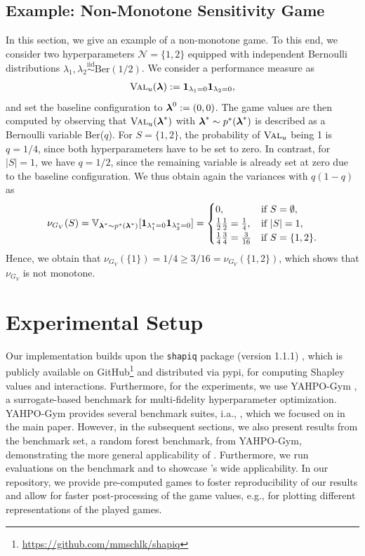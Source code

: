 \documentclass[letterpaper]{article} %
\begin{document}
\subsection{Example: Non-Monotone Sensitivity Game}\label{appx_sec_non_monotone_example}
In this section, we give an example of a non-monotone \sensitivity game.
To this end, we consider two hyperparameters $\mathcal N = \{1,2\}$ equipped with independent Bernoulli distributions $\lambda_1,\lambda_2 \overset{\text{iid}}{\sim} \text{Ber}(1/2)$.
We consider a performance measure as
\begin{align*}
    \textsc{Val}_u(\boldsymbol{\lambda}) := \mathbf{1}_{\lambda_1=0}\mathbf{1}_{\lambda_2=0},
\end{align*}
and set the baseline configuration to $\boldsymbol{\lambda}^0 := (0,0)$. 
The \sensitivity game values are then computed by observing that $\textsc{Val}_u(\boldsymbol{\lambda}^\ast)$ with $\boldsymbol{\lambda}^\ast \sim p^\ast(\boldsymbol{\lambda}^\ast)$ is described as a Bernoulli variable Ber($q$).
For $S=\{1,2\}$, the probability of $\textsc{Val}_u$ being 1 is $q=1/4$, since both hyperparameters have to be set to zero.
In contrast, for $\vert S \vert = 1$, we have $q=1/2$, since the remaining variable is already set at zero due to the baseline configuration.
We thus obtain again the variances with $q(1-q)$ as 
\[
\nu_{G_V}(S) = \mathbb{V}_{\boldsymbol{\lambda}^\ast \sim p^\ast(\boldsymbol{\lambda}^\ast)}[\mathbf{1}_{\lambda^\ast_1=0}\mathbf{1}_{\lambda^\ast_2=0}] = 
    \begin{cases}
        0, & \text{if } S=\emptyset, \\
        \frac{1}{2}\frac{1}{2} = \frac{1}{4}, &\text{if } \vert S \vert = 1, \\
        \frac{1}{4}\frac{3}{4} = \frac{3}{16} &\text{if } S= \{1,2\}.

    \end{cases}
\]
Hence, we obtain that $\nu_{G_V}(\{1\}) = 1/4 \geq 3/16 = \nu_{G_V}(\{1,2\})$, which shows that $\nu_{G_V}$ is not monotone.

\section{Experimental Setup}\label{app_experiment-setup}

Our implementation builds upon the \texttt{shapiq} package (version 1.1.1) \citep{Muschalik.2024}, which is publicly available on GitHub\footnote{\url{https://github.com/mmschlk/shapiq}} and distributed via pypi, for computing Shapley values and interactions. Furthermore, for the experiments, we use YAHPO-Gym \citep{DBLP:conf/automl/PfistererSMBB22}, a surrogate-based benchmark for multi-fidelity hyperparameter optimization. YAHPO-Gym provides several benchmark suites, i.a., \lcbench \citep{zimmer-tpami21a}, which we focused on in the main paper. However, in the subsequent sections, we also present results from the \rbvranger benchmark set, a random forest benchmark, from YAHPO-Gym, demonstrating the more general applicability of \tool. Furthermore, we run evaluations on the benchmark \pdone and \jahs to showcase \tool's wide applicability. In our repository, we provide pre-computed games to foster reproducibility of our results and allow for faster post-processing of the game values, e.g., for plotting different representations of the played games.
\end{document}
